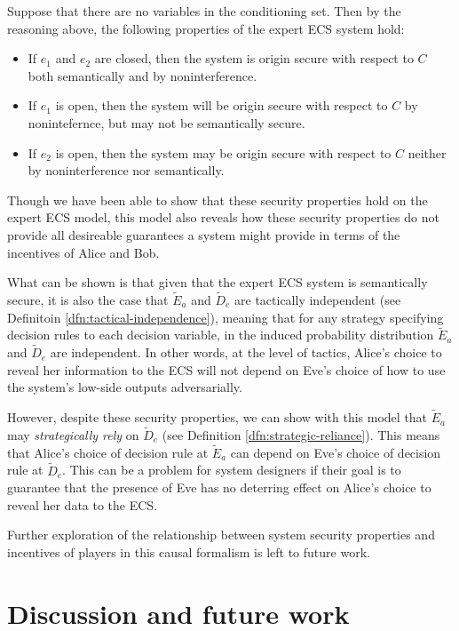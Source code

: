 \documentclass[../thesis.tex]{subfiles}
\begin{document}
Suppose that there are no variables in the conditioning
set.
Then by the reasoning above, the following properties
of the expert ECS system hold:
\begin{itemize}
\item If $e_1$ and $e_2$ are closed, then the system is
  origin secure with respect to $C$ both semantically
  and by noninterference.
\item If $e_1$ is open, then the system will be origin
  secure with respect to $C$ by nonintefernce, but may not
  be semantically secure.
\item If $e_2$ is open, then the system may be origin secure
  with respect to $C$ neither by noninterference nor semantically.
\end{itemize}

Though we have been able to show that these security
properties hold on the expert ECS model, this model
also reveals how these security properties do not
provide all desireable guarantees a system might
provide in terms of the incentives of Alice and Bob.

What can be shown is that given that the expert ECS
system is semantically secure, it is also the case
that $\tilde{E}_a$ and $\tilde{D}_e$ are tactically
independent (see Definitoin \ref{dfn:tactical-independence}),
meaning that for any strategy specifying decision rules
to each decision variable, in the induced probability
distribution $\tilde{E}_a$ and $\tilde{D}_e$ are independent.
In other words, at the level of tactics, Alice's choice to
reveal her information to the ECS will not depend on Eve's
choice of how to use the system's low-side outputs
adversarially.

However, despite these security properties,
we can show with this model that $\tilde{E}_a$
may \emph{strategically rely} on $\tilde{D}_e$
(see Definition \ref{dfn:strategic-reliance}).
This means that Alice's choice of decision rule 
at $\tilde{E}_a$ can depend on Eve's choice of
decision rule at $\tilde{D}_e$.
This can be a problem for system designers if
their goal is to guarantee that the presence of
Eve has no deterring effect on Alice's choice
to reveal her data to the ECS.

Further exploration of the relationship between
system security properties and incentives of
players in this causal formalism is left to
future work.

\section{Discussion and future work}
\label{sec:future}
\end{document}
